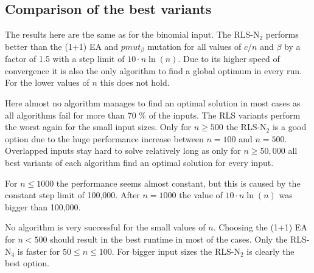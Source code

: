 \subsection{Comparison of the best variants}




The results here are the same as for the binomial input. The RLS-N$_2$ performs better than the (1+1) EA and $pmut_\beta$ mutation for all values of $c/n$ and $\beta$ by a factor of 1.5 with a step limit of $10 \cdot n \ln(n)$.
Due to its higher speed of convergence it is also the only algorithm to find a global optimum in every run.
For the lower values of $n$ this does not hold.



Here almost no algorithm manages to find an optimal solution in most cases as all algorithms fail for more than 70 \% of the inputs.
The RLS variants perform the worst again for the small input sizes.
Only for $n\ge500$ the RLS-N$_{2}$ is a good option due to the huge performance increase between $n=100$ and $n=500$.
Overlapped inputs stay hard to solve relatively long as only for $n\ge50,000$ all best variants of each algorithm find an optimal solution for every input.



For $n\le1000$ the performance seems almost constant, but this is caused by the constant step limit of 100,000.
After $n=1000$ the value of $10 \cdot n \ln(n)$ was bigger than 100,000.



No algorithm is very successful for the small values of $n$.
Choosing the (1+1) EA for $n<500$ should result in the best runtime in most of the cases.
Only the RLS-N$_4$ is faster for $50\le n \le 100$.
For bigger input sizes the RLS-N$_2$ is clearly the best option.
